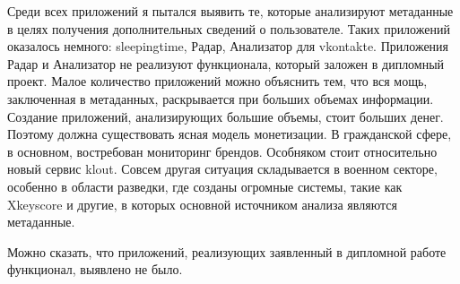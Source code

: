 \begin{itemize}
Среди всех приложений я пытался выявить те, которые анализируют метаданные в целях получения дополнительных сведений о пользователе. Таких приложений оказалось немного: sleepingtime, Радар, Анализатор для vkontakte. Приложения Радар и Анализатор не реализуют функционала, который заложен в дипломный проект. Малое количество приложений можно объяснить тем, что вся мощь, заключенная в метаданных, раскрывается при больших объемах информации. Создание приложений, анализирующих большие объемы, стоит больших денег. Поэтому должна существовать ясная модель монетизации. В гражданской сфере, в основном, востребован мониторинг брендов. Особняком стоит относительно новый сервис klout. Совсем другая ситуация складывается в военном секторе, особенно в области разведки, где созданы огромные системы, такие как Xkeyscore и другие, в которых основной источником анализа являются метаданные.  %

Можно сказать, что приложений, реализующих заявленный в дипломной работе функционал, выявлено не было.  


\end{itemize}

